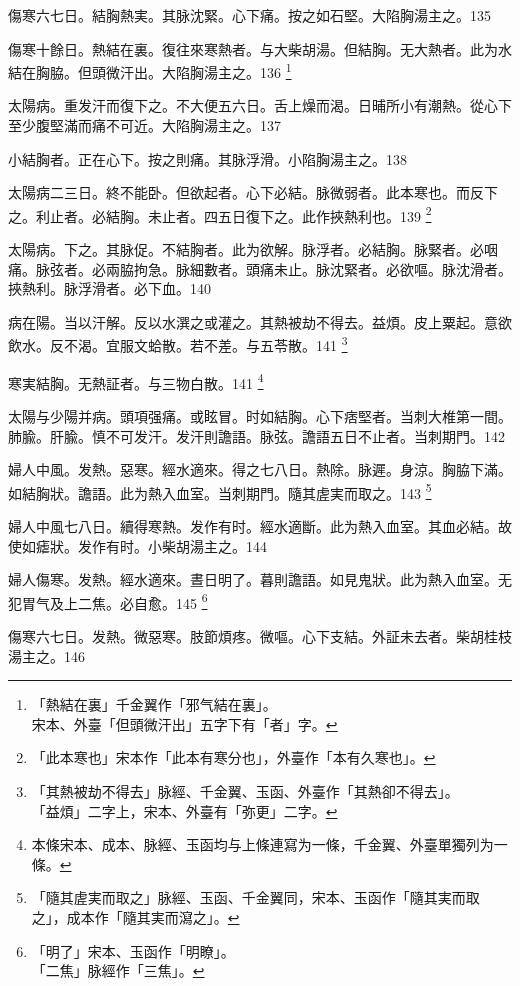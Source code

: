 \documentclass[b5paper,twoside,zihao=-4,UTF8]{ctexbook}
\begin{document}
傷寒六七日。結胸熱実。其脉沈緊。心下痛。按之如石堅。大陷胸湯主之。135

傷寒十餘日。熱結在裏。復往來寒熱者。与大柴胡湯。但結胸。无大熱者。此为水結在胸脇。{但}頭微汗出。大陷胸湯主之。136
	\footnote{「熱結在裏」千金翼作「邪气結在裏」。\\宋本、外臺「但頭微汗出」五字下有「者」字。}

太陽病。重发汗而復下之。不大便五六日。舌上燥而渴。日晡所小有潮熱。從心下至少腹堅滿而痛不可近。大陷胸湯主之。137

小結胸者。正在心下。按之則痛。其脉浮滑。小陷胸湯主之。138

太陽病二三日。{終}不能卧。但欲起者。心下必結。脉微弱者。此本寒也。而反下之。利止者。必結胸。未止者。四五日復下之。此{作}挾熱利也。139
	\footnote{「此本寒也」宋本作「此本有寒分也」，外臺作「本有久寒也」。}

太陽病。下之。其脉促。不結胸者。此为欲解。脉浮者。必結胸。脉緊者。必咽痛。脉弦者。必兩脇拘急。脉細數者。頭痛未止。脉沈緊者。必欲嘔。脉沈滑者。挾熱利。脉浮滑者。必下血。140

病在陽。当以汗解。反以水潠之或灌之。其熱被劫不得去。益煩。皮上粟起。意欲飲水。反不渴。宜服文蛤散。若不差。与五苓散。141
	\footnote{「其熱被劫不得去」脉經、千金翼、玉函、外臺作「其熱卻不得去」。\\「益煩」二字上，宋本、外臺有「弥更」二字。}

寒実結胸。无熱証者。与三物白散。141
	\footnote{本條宋本、成本、脉經、玉函均与上條連寫为一條，千金翼、外臺單獨列为一條。}

太陽与少陽并病。頭項强痛。或眩冒。时如結胸。心下痞堅者。当刺大椎第一間。肺腧。肝腧。慎不可发汗。发汗則譫語。脉弦。譫語五日不止者。当刺期門。142

婦人中風。发熱。惡寒。經水適來。得之七八日。熱除。脉遲。身涼。胸脇下滿。如結胸狀。譫語。此为熱入血室。当刺期門。隨其{虗}実而取之。143
	\footnote{「隨其虗実而取之」脉經、玉函、千金翼同，宋本、玉函作「隨其実而取之」，成本作「隨其実而瀉之」。}

婦人中風七八日。續得寒熱。发作有时。經水適斷。此为熱入血室。其血必結。故使如瘧狀。发作有时。小柴胡湯主之。144

婦人傷寒。发熱。經水適來。晝日明了。暮則譫語。如見鬼狀。此为熱入血室。无犯胃气及上二焦。必自愈。145
	\footnote{「明了」宋本、玉函作「明瞭」。\\「二焦」脉經作「三焦」。}

傷寒六七日。发熱。微惡寒。肢節煩疼。微嘔。心下支結。外証未去者。柴胡桂枝湯主之。146
\end{document}
